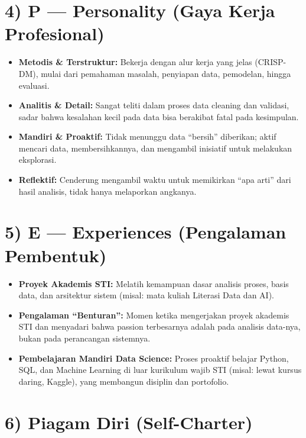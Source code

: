 \documentclass[
  letterpaper,
  DIV=11,
  numbers=noendperiod]{scrreprt}
\providecommand{\tightlist}{%
  \setlength{\itemsep}{0pt}\setlength{\parskip}{0pt}}
\begin{document}
\section{4) P --- Personality (Gaya Kerja
Profesional)}\label{p-personality-gaya-kerja-profesional}

\begin{itemize}
\tightlist
\item
  \textbf{Metodis \& Terstruktur:} Bekerja dengan alur kerja yang jelas
  (CRISP-DM), mulai dari pemahaman masalah, penyiapan data, pemodelan,
  hingga evaluasi.
\item
  \textbf{Analitis \& Detail:} Sangat teliti dalam proses data cleaning
  dan validasi, sadar bahwa kesalahan kecil pada data bisa berakibat
  fatal pada kesimpulan.
\item
  \textbf{Mandiri \& Proaktif:} Tidak menunggu data ``bersih''
  diberikan; aktif mencari data, membersihkannya, dan mengambil
  inisiatif untuk melakukan eksplorasi.
\item
  \textbf{Reflektif:} Cenderung mengambil waktu untuk memikirkan ``apa
  arti'' dari hasil analisis, tidak hanya melaporkan angkanya.
\end{itemize}

\section{5) E --- Experiences (Pengalaman
Pembentuk)}\label{e-experiences-pengalaman-pembentuk}

\begin{itemize}
\tightlist
\item
  \textbf{Proyek Akademis STI:} Melatih kemampuan dasar analisis proses,
  basis data, dan arsitektur sistem (misal: mata kuliah Literasi Data
  dan AI).
\item
  \textbf{Pengalaman ``Benturan'':} Momen ketika mengerjakan proyek
  akademis STI dan menyadari bahwa passion terbesarnya adalah pada
  analisis data-nya, bukan pada perancangan sistemnya.
\item
  \textbf{Pembelajaran Mandiri Data Science:} Proses proaktif belajar
  Python, SQL, dan Machine Learning di luar kurikulum wajib STI (misal:
  lewat kursus daring, Kaggle), yang membangun disiplin dan portofolio.
\end{itemize}

\section{6) Piagam Diri (Self-Charter)}\label{piagam-diri-self-charter}
\end{document}
